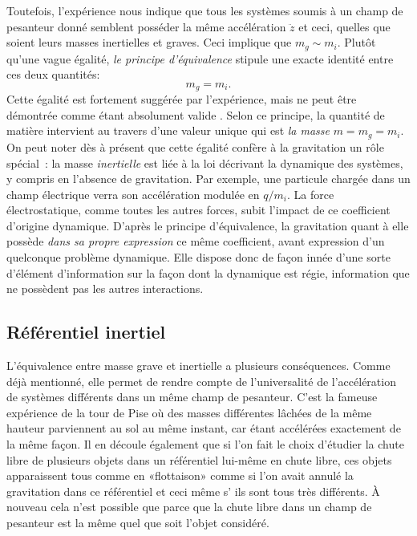 Toutefois, l'expérience nous indique que tous les systèmes soumis à un champ de pesanteur donné semblent posséder la même accélération $\ddot z$ et ceci, quelles que soient leurs masses inertielles et graves. Ceci implique que $m_g\sim m_i$. Plutôt qu'une vague égalité, \textit{le principe d'équivalence} stipule une exacte identité entre ces deux quantités:
\begin{equation}
m_g=m_i.
\end{equation}
Cette égalité est fortement suggérée par l'expérience, mais ne peut être démontrée comme étant absolument valide . Selon ce principe, la quantité de matière intervient au travers d'une valeur unique qui est \textit{la masse} $m=m_g=m_i$. On peut noter dès à présent que cette égalité confère à la gravitation un rôle spécial~: la masse \textit{inertielle} est liée à la loi décrivant la dynamique des systèmes, y compris en l'absence de gravitation. Par exemple, une particule chargée dans un champ électrique verra son accélération modulée en $q/m_i$. La force électrostatique, comme toutes les autres forces, subit l'impact de ce coefficient d'origine dynamique. D'après le principe d'équivalence, la gravitation quant à elle possède \textit{dans sa propre expression} ce même coefficient, avant expression d'un quelconque problème dynamique. Elle dispose donc de façon innée d'une sorte d'élément d'information sur la façon dont la dynamique est régie, information que ne possèdent pas les autres interactions.

\subsection{Référentiel inertiel}
L'équivalence entre masse grave et inertielle a plusieurs conséquences. Comme déjà mentionné, elle permet de rendre compte de l'universalité de l'accélération de systèmes différents dans un même champ de pesanteur. C'est la fameuse expérience de la tour de Pise où des masses différentes lâchées de la même hauteur parviennent au sol au même instant, car étant accélérées exactement de la même façon. Il en découle également que si l'on fait le choix d'étudier la chute libre de plusieurs objets dans un référentiel lui-même en chute libre, ces objets apparaissent tous comme en «flottaison» comme si l'on avait annulé la gravitation dans ce référentiel et ceci même s’ ils sont tous très différents. À nouveau cela n'est possible que parce que la chute libre dans un champ de pesanteur est la même quel que soit l'objet considéré. 

